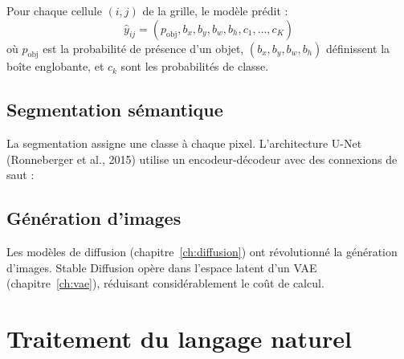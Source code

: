 Pour chaque cellule $(i,j)$ de la grille, le mod\`ele pr\'edit :
\[
\hat{y}_{ij} = (p_{\mathrm{obj}}, b_x, b_y, b_w, b_h, c_1, \ldots, c_K)
\]
o\`u $p_{\mathrm{obj}}$ est la probabilit\'e de pr\'esence d'un objet, $(b_x, b_y, b_w, b_h)$ d\'efinissent la bo\^ite englobante, et $c_k$ sont les probabilit\'es de classe.

\subsection{Segmentation s\'emantique}

La segmentation assigne une classe \`a chaque pixel. L'architecture U-Net (Ronneberger et al., 2015) utilise un encodeur-d\'ecodeur avec des connexions de saut :

\begin{center}
\end{center}

\subsection{G\'en\'eration d'images}

Les mod\`eles de diffusion (chapitre~\ref{ch:diffusion}) ont r\'evolutionn\'e la g\'en\'eration d'images. Stable Diffusion op\`ere dans l'espace latent d'un VAE (chapitre~\ref{ch:vae}), r\'eduisant consid\'erablement le co\^ut de calcul.

\section{Traitement du langage naturel}
\label{sec:app_nlp}

